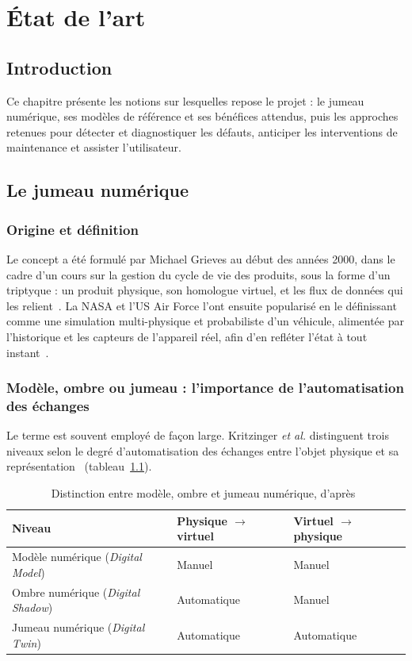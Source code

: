 \chapter{État de l'art}
\label{chap:etatart}

\section{Introduction}
Ce chapitre présente les notions sur lesquelles repose le projet : le jumeau numérique, ses modèles de référence et ses bénéfices attendus, puis les approches retenues pour détecter et diagnostiquer les défauts, anticiper les interventions de maintenance et assister l'utilisateur.

\section{Le jumeau numérique}

\subsection{Origine et définition}
Le concept a été formulé par Michael Grieves au début des années 2000, dans le cadre d'un cours sur la gestion du cycle de vie des produits, sous la forme d'un triptyque : un produit physique, son homologue virtuel, et les flux de données qui les relient~\cite{grieves2017}. La NASA et l'US Air Force l'ont ensuite popularisé en le définissant comme une simulation multi-physique et probabiliste d'un véhicule, alimentée par l'historique et les capteurs de l'appareil réel, afin d'en refléter l'état à tout instant~\cite{glaessgen2012}.

\subsection{Modèle, ombre ou jumeau : l'importance de l'automatisation des échanges}
Le terme est souvent employé de façon large. Kritzinger \textit{et al.} distinguent trois niveaux selon le degré d'automatisation des échanges entre l'objet physique et sa représentation~\cite{kritzinger2018} (tableau~\ref{tab:kritzinger}).

\begin{table}[H]
\centering
\caption{Distinction entre modèle, ombre et jumeau numérique, d'après~\cite{kritzinger2018}}
\label{tab:kritzinger}
\begin{tabularx}{\textwidth}{lXX}
\toprule
\textbf{Niveau} & \textbf{Physique $\rightarrow$ virtuel} & \textbf{Virtuel $\rightarrow$ physique} \\
\midrule
Modèle numérique (\textit{Digital Model}) & Manuel & Manuel \\
Ombre numérique (\textit{Digital Shadow}) & Automatique & Manuel \\
Jumeau numérique (\textit{Digital Twin}) & Automatique & Automatique \\
\bottomrule
\end{tabularx}
\end{table}

